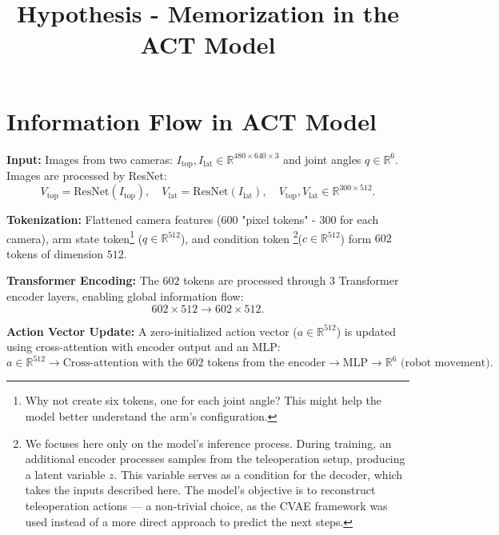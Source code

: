 \documentclass[a4paper,12pt]{article}
\begin{document}
\title{Hypothesis - Memorization in the ACT Model}
\author{}
\date{}
\maketitle

\section*{Information Flow in ACT Model}
\textbf{Input:} Images from two cameras: $I_{\text{top}}, I_{\text{lat}} \in \mathbb{R}^{480 \times 640 \times 3}$ and joint angles $q \in \mathbb{R}^6$. Images are processed by ResNet: 
\[ V_{\text{top}} = \text{ResNet}(I_{\text{top}}), \quad V_{\text{lat}} = \text{ResNet}(I_{\text{lat}}), \quad V_{\text{top}}, V_{\text{lat}} \in \mathbb{R}^{300 \times 512}.
\]

\textbf{Tokenization:} Flattened camera features ($600$ "pixel tokens" - 300 for each camera), arm state token\footnote{Why not create six tokens, one for each joint angle? This might help the model better understand the arm's configuration.} 
($q \in \mathbb{R}^{512}$), and condition token
\footnote{We focuses here only on the model's inference process. During training, an additional encoder processes samples from the teleoperation setup, producing a latent variable $z$. This variable serves as a condition for the decoder, which takes the inputs described here. The model's objective is to reconstruct teleoperation actions — a non-trivial choice, as the CVAE framework was used instead of a more direct approach to predict the next steps.}($c \in \mathbb{R}^{512}$) form $602$ tokens of dimension $512$.

\textbf{Transformer Encoding:} The $602$ tokens are processed through $3$ Transformer encoder layers, enabling global information flow:
\[ 602 \times 512 \rightarrow 602 \times 512.
\]

\textbf{Action Vector Update:} A zero-initialized action vector ($a \in \mathbb{R}^{512}$) is updated using cross-attention with encoder output and an MLP:
\[ a \in \mathbb{R}^{512} \rightarrow \text{Cross-attention with the 602 tokens from the encoder} \rightarrow \text{MLP} \rightarrow \mathbb{R}^{6} \text{ (robot movement)}.
\]
\end{document}
